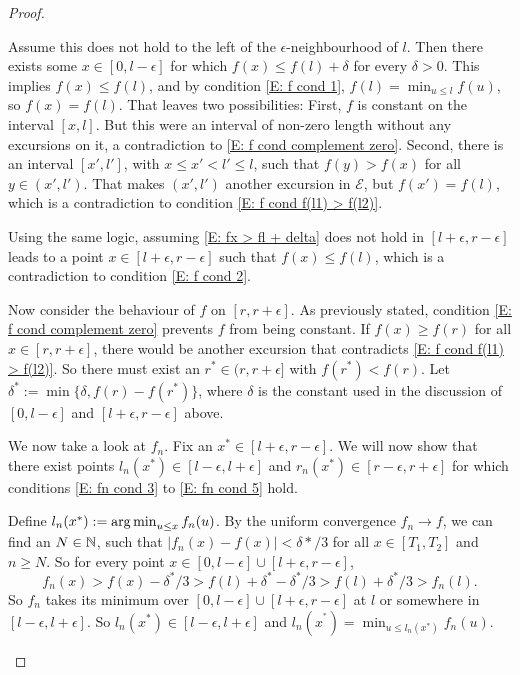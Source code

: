 \begin{proof}
\begin{proofpart}
Assume this does not hold to the left of the $\epsilon$-neighbourhood of $l$.
Then there exists some $x \in [0, l-\epsilon]$
for which $f(x) \leq f(l) + \delta$ for every $\delta > 0$.
This implies $f(x) \leq f(l)$,
and by condition \eqref{E: f cond 1},
$f(l) = \min_{u \leq l}f(u)$,
so $f(x) = f(l)$.
That leaves two possibilities:
First, $f$ is constant on the interval $[x,l]$.
But this were an interval of non-zero length without any excursions on it,
a contradiction to \eqref{E: f cond complement zero}.
Second, there is an interval
$[x', l']$, with $x\leq x'<l' \leq l$,
such that $f(y) > f(x)$ for all $y \in (x',l')$.
That makes $(x',l')$ another excursion in $\mathcal{E}$,
but $f(x') = f(l)$,
which is a contradiction to condition \eqref{E: f cond f(l1) > f(l2)}.

Using the same logic,
assuming \eqref{E: fx > fl + delta} does not hold in $[l + \epsilon, r- \epsilon]$
leads to a point $x \in [l + \epsilon, r- \epsilon]$
such that $f(x) \leq f(l)$,
which is a contradiction to condition \eqref{E: f cond 2}.

Now consider the behaviour of $f$ on $[r, r + \epsilon]$.
As previously stated, 
condition \eqref{E: f cond complement zero} prevents $f$ from being constant.
If $f(x) \geq f(r)$ for all $x \in [r, r + \epsilon]$,
there would be another excursion that contradicts \eqref{E: f cond f(l1) > f(l2)}.
So there must exist an $r^* \in (r, r + \epsilon]$ with $f(r^*) < f(r)$.
Let $\delta^* := \min\{ \delta, f(r) - f(r^*) \}$,
where $\delta$ is the constant used in the discussion of
$[0, l-\epsilon]$ and $[l+\epsilon, r-\epsilon]$ above.


We now take a look at $f_n$.
Fix an $x^* \in [l+\epsilon, r-\epsilon]$.
We will now show that there exist points
$l_n(x^*) \in [l-\epsilon, l+\epsilon]$
and 
$r_n(x^*) \in [r-\epsilon, r+\epsilon]$
for which conditions \eqref{E: fn cond 3} to \eqref{E: fn cond 5} hold.

Define $l_n(x^*) := \operatorname*{arg\,min}_{u \leq x} f_n(u)$.
By the uniform convergence $f_n \rightarrow f$,
we can find an $N \in \mathbb{N}$,
such that $|f_n(x) - f(x)| < \delta* / 3$ for all
$x \in [T_1, T_2]$ and $n \geq N$.
So for every point $x \in [0, l - \epsilon]\cup[l + \epsilon, r - \epsilon]$,
\begin{equation} \label{E: fn(x) > fn(l)}
f_n(x) > f(x) - \delta^* / 3 > f(l) + \delta^* - \delta^* / 3 > f(l) + \delta^* / 3 > f_n(l).
\end{equation}
So $f_n$ takes its minimum over 
$[0, l - \epsilon]\cup[l + \epsilon, r - \epsilon]$
at $l$ or somewhere in $[l-\epsilon, l+\epsilon]$.
So $l_n(x^*) \in [l-\epsilon, l+\epsilon]$ and
$l_n(x^^*) = \min_{u \leq l_n(x^*)} f_n(u)$.


\end{proofpart}
\end{proof}
